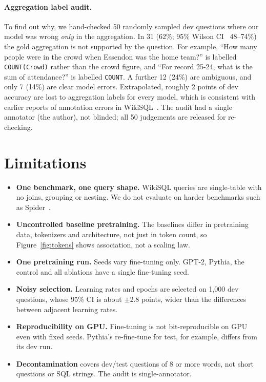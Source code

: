 \documentclass[11pt]{article}
\begin{document}
\paragraph{Aggregation label audit.} To find out why, we hand-checked 50 randomly sampled dev questions where our model was wrong \emph{only} in the aggregation. In 31 (62\%; 95\% Wilson CI~\cite{wilson1927} 48--74\%) the gold aggregation is not supported by the question. For example, ``How many people were in the crowd when Essendon was the home team?'' is labelled \texttt{COUNT(Crowd)} rather than the crowd figure, and ``For record 25-24, what is the sum of attendance?'' is labelled \texttt{COUNT}. A further 12 (24\%) are ambiguous, and only 7 (14\%) are clear model errors. Extrapolated, roughly 2 points of dev accuracy are lost to aggregation labels for every model, which is consistent with earlier reports of annotation errors in WikiSQL~\cite{hwang2019sqlova,pihulski2025llmsql}. The audit had a single annotator (the author), not blinded; all 50 judgements are released for re-checking.

\section{Limitations}

\begin{itemize}
  \item \textbf{One benchmark, one query shape.} WikiSQL queries are single-table with no joins, grouping or nesting. We do not evaluate on harder benchmarks such as Spider~\cite{yu2018spider}.
  \item \textbf{Uncontrolled baseline pretraining.} The baselines differ in pretraining data, tokenizers and architecture, not just in token count, so Figure~\ref{fig:tokens} shows association, not a scaling law.
  \item \textbf{One pretraining run.} Seeds vary fine-tuning only. GPT-2, Pythia, the control and all ablations have a single fine-tuning seed.
  \item \textbf{Noisy selection.} Learning rates and epochs are selected on 1,000 dev questions, whose 95\% CI is about $\pm$2.8 points, wider than the differences between adjacent learning rates.
  \item \textbf{Reproducibility on GPU.} Fine-tuning is not bit-reproducible on GPU even with fixed seeds. Pythia's re-fine-tune for test, for example, differs from its dev run.
  \item \textbf{Decontamination} covers dev/test questions of 8 or more words, not short questions or SQL strings. The audit is single-annotator.
\end{itemize}
\end{document}
